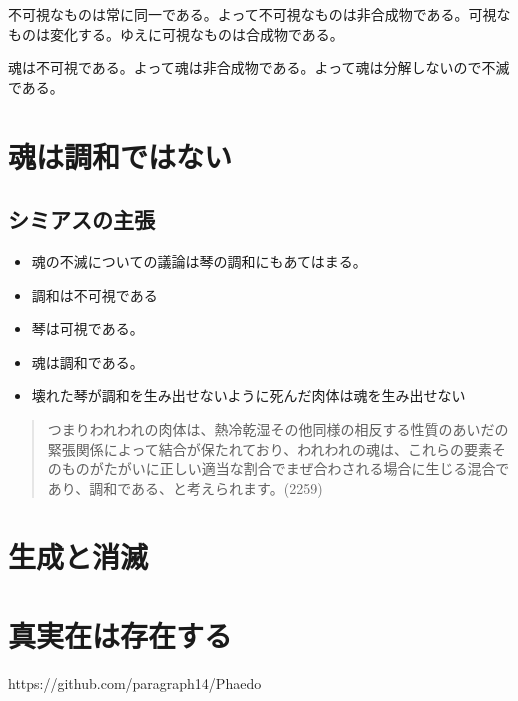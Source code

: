 \documentclass[a4j,11pt]{jarticle}
\begin{document}
不可視なものは常に同一である。よって不可視なものは非合成物である。可視なものは変化する。ゆえに可視なものは合成物である。

魂は不可視である。よって魂は非合成物である。よって魂は分解しないので不滅である。

\section{魂は調和ではない}
\subsection{シミアスの主張}
\begin{itemize}
    \item 魂の不滅についての議論は琴の調和にもあてはまる。
    \item 調和は不可視である
    \item 琴は可視である。
    \item 魂は調和である。
    \item 壊れた琴が調和を生み出せないように死んだ肉体は魂を生み出せない
\end{itemize}

\begin{quote}    
    つまりわれわれの肉体は、熱冷乾湿その他同様の相反する性質のあいだの緊張関係によって結合が保たれており、われわれの魂は、これらの要素そのものがたがいに正しい適当な割合でまぜ合わされる場合に生じる混合であり、調和である、と考えられます。(2259)
\end{quote}

\section{生成と消滅}

\section{真実在は存在する}

https://github.com/paragraph14/Phaedo
\end{document}
